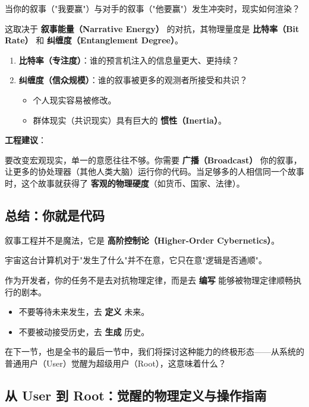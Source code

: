 当你的叙事（"我要赢"）与对手的叙事（"他要赢"）发生冲突时，现实如何渲染？

这取决于 \textbf{叙事能量（Narrative Energy）} 的对抗，其物理量度是 \textbf{比特率（Bit Rate）} 和 \textbf{纠缠度（Entanglement Degree）}。

\begin{enumerate}
\item \textbf{比特率（专注度）}：谁的预言机注入的信息量更大、更持续？

\item \textbf{纠缠度（信众规模）}：谁的叙事被更多的观测者所接受和共识？

    \begin{itemize}
    \item 个人现实容易被修改。

    \item 群体现实（共识现实）具有巨大的 \textbf{惯性（Inertia）}。
    \end{itemize}
\end{enumerate}

\textbf{工程建议}：

要改变宏观现实，单一的意愿往往不够。你需要 \textbf{广播（Broadcast）} 你的叙事，让更多的协处理器（其他人类大脑）运行你的代码。当足够多的人相信同一个故事时，这个故事就获得了 \textbf{客观的物理硬度}（如货币、国家、法律）。

\subsection{总结：你就是代码}

叙事工程并不是魔法，它是 \textbf{高阶控制论（Higher-Order Cybernetics）}。

宇宙这台计算机对于"发生了什么"并不在意，它只在意"逻辑是否通顺"。

作为开发者，你的任务不是去对抗物理定律，而是去 \textbf{编写} 能够被物理定律顺畅执行的剧本。

\begin{itemize}
\item 不要等待未来发生，去 \textbf{定义} 未来。

\item 不要被动接受历史，去 \textbf{生成} 历史。
\end{itemize}

在下一节，也是全书的最后一节中，我们将探讨这种能力的终极形态——从系统的普通用户（User）觉醒为超级用户（Root），这意味着什么？

\subsection{从 User 到 Root：觉醒的物理定义与操作指南}


